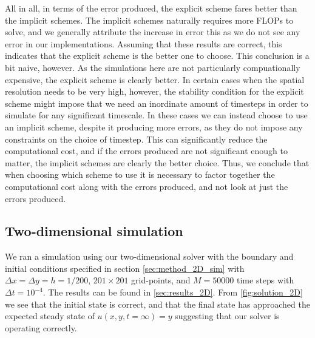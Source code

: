 \documentclass[reprint,english,notitlepage]{revtex4-1}  %
\begin{document}
All in all, in terms of the error produced, the explicit scheme fares better than the implicit schemes. The implicit schemes naturally requires more FLOPs to solve, and we generally attribute the increase in error this as we do not see any error in our implementations. Assuming that these results are correct, this indicates that the explicit scheme is the better one to choose. This conclusion is a bit naive, however. As the simulations here are not particularly compuationally expensive, the explicit scheme is clearly better. In certain cases when the spatial resolution needs to be very high, however, the stability condition for the explicit scheme might impose that we need an inordinate amount of timesteps in order to simulate for any significant timescale. In these cases we can instead choose to use an implicit scheme, despite it producing more errors, as they do not impose any constraints on the choice of timestep. This can significantly reduce the computational cost, and if the errors produced are not significant enough to matter, the implicit schemes are clearly the better choice. Thus, we conclude that when choosing which scheme to use it is necessary to factor together the computational cost along with the errors produced, and not look at just the errors produced.    

\subsection{Two-dimensional simulation} \label{sec:discussion_2D}
We ran a simulation using our two-dimensional solver with the boundary and initial conditions specified in section \ref{sec:method_2D_sim} with \(\Delta x = \Delta y = h = 1/200\), \(201\times 201\) grid-points, and \(M = 50000\) time steps with \(\Delta t = 10^{-4}\). The results can be found in \autoref{sec:results_2D}. From \autoref{fig:solution_2D} we see that the initial state is correct, and that the final state has approached the expected steady state of \(u(x, y, t=\infty) = y\) suggesting that our solver is operating correctly.
\end{document}
